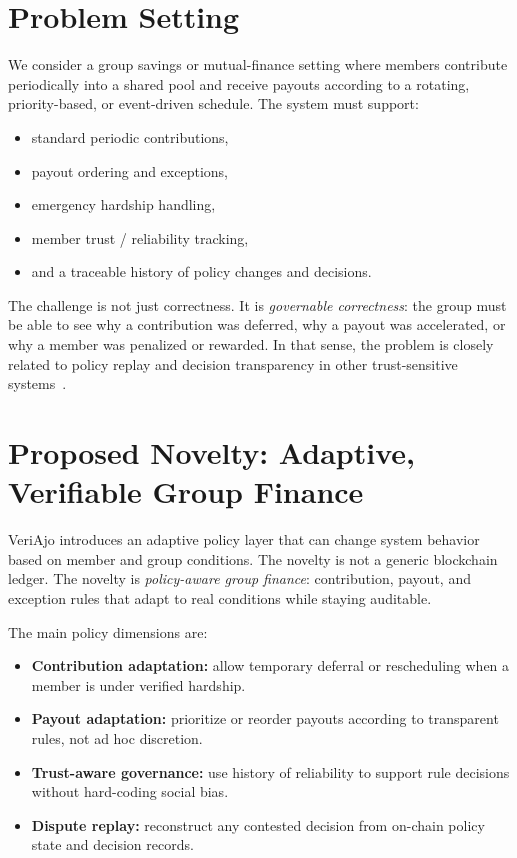 \documentclass[10pt, conference]{IEEEtran}
\begin{document}
\section{Problem Setting}
We consider a group savings or mutual-finance setting where members contribute periodically into a shared pool and receive payouts according to a rotating, priority-based, or event-driven schedule. The system must support:
\begin{itemize}
    \item standard periodic contributions,
    \item payout ordering and exceptions,
    \item emergency hardship handling,
    \item member trust / reliability tracking,
    \item and a traceable history of policy changes and decisions.
\end{itemize}

The challenge is not just correctness. It is \emph{governable correctness}: the group must be able to see why a contribution was deferred, why a payout was accelerated, or why a member was penalized or rewarded. In that sense, the problem is closely related to policy replay and decision transparency in other trust-sensitive systems~\cite{guo2017calibration,hendrycks2017baseline}.

\section{Proposed Novelty: Adaptive, Verifiable Group Finance}
VeriAjo introduces an adaptive policy layer that can change system behavior based on member and group conditions. The novelty is not a generic blockchain ledger. The novelty is \emph{policy-aware group finance}: contribution, payout, and exception rules that adapt to real conditions while staying auditable.

The main policy dimensions are:
\begin{itemize}
    \item \textbf{Contribution adaptation:} allow temporary deferral or rescheduling when a member is under verified hardship.
    \item \textbf{Payout adaptation:} prioritize or reorder payouts according to transparent rules, not ad hoc discretion.
    \item \textbf{Trust-aware governance:} use history of reliability to support rule decisions without hard-coding social bias.
    \item \textbf{Dispute replay:} reconstruct any contested decision from on-chain policy state and decision records.
\end{itemize}
\end{document}
